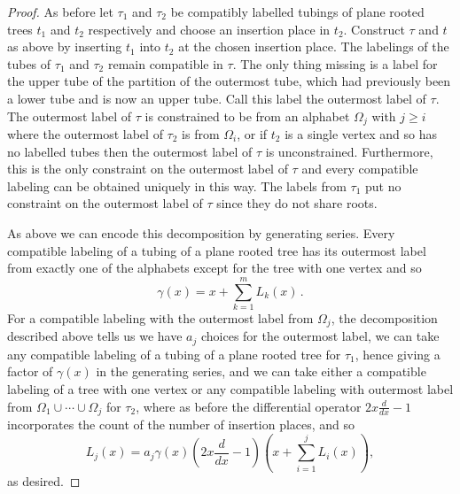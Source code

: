 \documentclass[oneside]{amsart}
\theoremstyle{definition}
\begin{document}
\begin{proof}
  As before let $\tau_1$ and $\tau_2$ be compatibly labelled tubings of plane rooted trees $t_1$ and $t_2$ respectively and choose an insertion place in $t_2$.  Construct $\tau$ and $t$ as above by inserting $t_1$ into $t_2$ at the chosen insertion place.  The labelings of the tubes of $\tau_1$ and $\tau_2$ remain compatible in $\tau$.  The only thing missing is a label for the upper tube of the partition of the outermost tube, which had previously been a lower tube and is now an upper tube.  Call this label the outermost label of $\tau$.  The outermost label of $\tau$ is constrained to be from an alphabet $\Omega_j$ with $j\geq i$ where the outermost label of $\tau_2$ is from $\Omega_i$, or if $t_2$ is a single vertex and so has no labelled tubes then the outermost label of $\tau$ is unconstrained.  Furthermore, this is the only constraint on the outermost label of $\tau$ and every compatible labeling can be obtained uniquely in this way. The labels from $\tau_1$ put no constraint on the outermost label of $\tau$ since they do not share roots.

  As above we can encode this decomposition by generating series.  Every compatible labeling of a tubing of a plane rooted tree has its outermost label from exactly one of the alphabets except for the tree with one vertex and so
  \[
  \gamma(x) = x + \sum_{k=1}^m L_k(x)\,.
  \]
  For a compatible labeling with the outermost label from $\Omega_j$, the decomposition described above tells us we have $a_j$ choices for the outermost label, we can take any compatible labeling of a tubing of a plane rooted tree for $\tau_1$, hence giving a factor of $\gamma(x)$ in the generating series, and we can take either a compatible labeling of a tree with one vertex or any compatible labeling with outermost label from $\Omega_1\cup\cdots\cup\Omega_j$ for $\tau_2$, where as before the differential operator $2x\frac{d}{dx}-1$ incorporates the count of the number of insertion places, and so
\[
L_j(x) = a_j \gamma(x) \left(2x\frac{d}{dx}-1\right)\left(x+\sum_{i=1}^{j}L_i(x)\right),
\]
as desired.
\end{proof}
\end{document}
